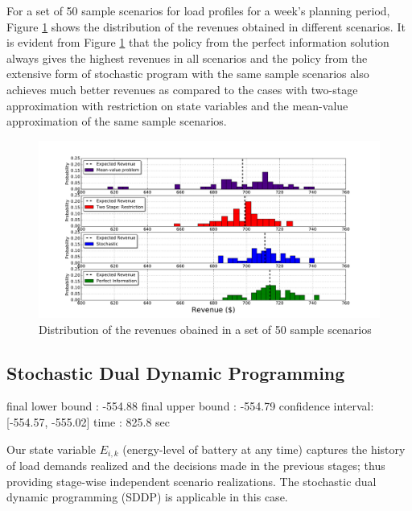 \documentclass[11pt,twoside]{article}
\begin{document}
For a set of 50 sample scenarios for load profiles for a week's planning period, Figure \ref{fig:histogram} shows the distribution of the revenues obtained in different scenarios. It is evident from Figure \ref{fig:histogram} that the policy from the perfect information solution always gives the highest revenues in all scenarios and the policy from the extensive form of stochastic program with the same sample scenarios also achieves much better revenues as compared to the cases with two-stage approximation with restriction on state variables and the mean-value approximation of the same sample scenarios.
\begin{figure}[h!]
\begin{center}
\includegraphics[scale=0.42]
{Figures/Plots/fullproblem_stoch/histogram_costs.pdf} \caption{Distribution of the revenues obained in a set of 50 sample scenarios}\label{fig:histogram}\end{center}
\end{figure}
\FloatBarrier

\subsection{Stochastic Dual Dynamic Programming}
final lower bound : -554.88
final upper bound : -554.79 confidence interval: [-554.57, -555.02]
time : 825.8 sec

Our state variable $E_{i,k}$ (energy-level of battery at any time) captures the history of load demands realized and the decisions made in the previous stages; thus providing stage-wise independent scenario realizations. The stochastic dual dynamic programming (SDDP) is applicable in this case. 
\end{document}

